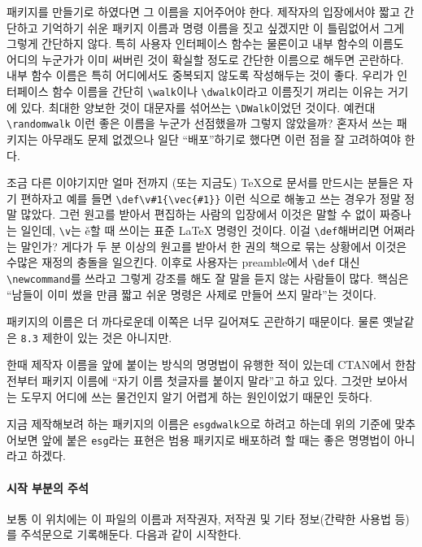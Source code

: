 \documentclass[a4paper,amsmath]{oblivoir}
\begin{document}
패키지를 만들기로 하였다면 그 이름을 지어주어야 한다. 제작자의 입장에서야
짧고 간단하고 기억하기 쉬운 패키지 이름과 명령 이름을 짓고 싶겠지만
이 틀림없어서 그게 그렇게
간단하지 않다.
특히 사용자 인터페이스 함수는 물론이고 내부 함수의 이름도 어디의 누군가가 이미
써버린 것이 확실할 정도로 간단한 이름으로 해두면 곤란하다. 내부 함수 이름은 특히
어디에서도 중복되지 않도록 작성해두는 것이 좋다. 우리가 인터페이스 함수 이름을
간단히 \verb|\walk|이나 \verb|\dwalk|이라고 이름짓기 꺼리는 이유는 거기에 있다.
최대한 양보한 것이 대문자를 섞어쓰는 \verb|\DWalk|이었던 것이다.
예컨대 \verb|\randomwalk| 이런 좋은 이름을 누군가 선점했을까 그렇지 않았을까?
혼자서 쓰는 패키지는 아무래도 문제 없겠으나 일단 “배포”하기로 했다면 이런 점을
잘 고려하여야 한다.

조금 다른 이야기지만 얼마 전까지 (또는 지금도) \TeX 으로 문서를 만드시는 분들은
자기 편하자고 예를 들면 \verb|\def\v#1{\vec{#1}}| 이런 식으로 해놓고 쓰는 경우가
정말 정말 많았다. 그런 원고를 받아서 편집하는 사람의 입장에서 이것은 말할 수 없이
짜증나는 일인데, \verb|\v|는 \v{e}할 때 쓰이는 표준 \LaTeX{} 명령인 것이다. 이걸
\verb|\def|해버리면 어쩌라는 말인가? 게다가 두 분 이상의 원고를 받아서 한 권의
책으로 묶는 상황에서 이것은 수많은 재정의 충돌을 일으킨다.
\LaTeXe{} 이후로 사용자는 preamble에서 \verb|\def| 대신 \verb|\newcommand|를
쓰라고 그렇게 강조를 해도 잘 말을 듣지 않는 사람들이 많다.
핵심은 “남들이 이미 썼을 만큼 짧고 쉬운 명령은 사제로 만들어 쓰지 말라”는 것이다.

패키지의 이름은 더 까다로운데 이쪽은 너무 길어져도 곤란하기 때문이다. 물론
옛날같은 \verb|8.3| 제한이 있는 것은 아니지만.

한때 제작자 이름을 앞에 붙이는 방식의 명명법이 유행한 적이 있는데 CTAN에서
한참 전부터 패키지 이름에 “자기 이름 첫글자를 붙이지 말라”고 하고 있다. 
그것만 보아서는 도무지 어디에 쓰는 물건인지 알기 어렵게 하는 원인이었기 때문인 듯하다.

지금 제작해보려 하는 패키지의 이름은 \verb|esgdwalk|으로 하려고 하는데 위의 기준에
맞추어보면 앞에 붙은 \verb|esg|라는 표현은 범용 패키지로 배포하려 할 때는 좋은
명명법이 아니라고 하겠다.


\paragraph{시작 부분의 주석}

보통 이 위치에는 이 파일의 이름과 저작권자, 저작권 및 기타 정보(간략한 사용법 등)를
주석문으로 기록해둔다. 다음과 같이 시작한다.
\end{document}
